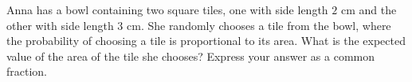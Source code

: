 Anna has a bowl containing two square tiles, one with side length $2$ cm and the other with side length $3$ cm. She randomly chooses a tile from the bowl, where the probability of choosing a tile is proportional to its area. What is the expected value of the area of the tile she chooses? Express your answer as a common fraction.
